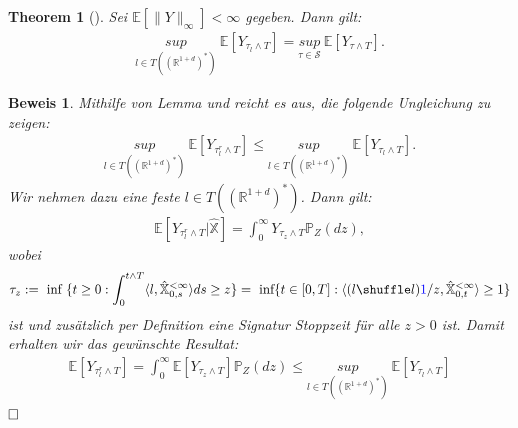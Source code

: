 \documentclass[12pt,titlepage,headsepline]{article}
\newtheorem*{theorem-non}{Theorem}
\newtheorem*{beweis-non}{Beweis}
\begin{document}
      \begin{theorem-non}[\cite{bayer_optimal_2020,Prop. 5.5}]
        Sei $\mathbb{E}[\lVert Y\rVert_\infty]<\infty$ gegeben. Dann gilt:
        \begin{align}\label{stopped_rough_path: main_equality}
          \underset{l \in T((\mathbb{R}^{1+d})^*)}{sup} \ \mathbb{E}[Y_{\tau_l \land T}] = \underset{\tau \in \mathcal{S}}{sup} \ \mathbb{E}[Y_{\tau \land T}].
        \end{align}
      \end{theorem-non}
      \begin{beweis-non}
        \textup{
        Mithilfe von Lemma und reicht es aus, die folgende Ungleichung zu zeigen:
        \begin{align*}
          \underset{l \in T((\mathbb{R}^{1+d})^*)}{sup} \ \mathbb{E}[Y_{\tau_l^r \land T}] \leq \underset{l \in T((\mathbb{R}^{1+d})^*)}{sup} \ \mathbb{E}[Y_{\tau_l \land T}].
        \end{align*}
        Wir nehmen dazu eine feste $l \in T((\mathbb{R}^{1+d})^*)$. Dann gilt:
        \begin{align*}
          \mathbb{E}[Y_{\tau_l^r \land T} \lvert \hat{\mathbb{X}}] = \int_0^{\infty} Y_{\tau_z\land T}\mathbb{P}_Z(dz),
        \end{align*}
        wobei
        \begin{align*}
          \tau_z := \ \text{inf} \ \{t \geq 0 : \int_0^{t \land T} \langle l,\hat{\mathbb{X}}^{<\infty}_{0,s}\rangle ds \geq z \}= \ \text{inf}\{t \in [0,T] : \langle (l \shuffle l)\textcolor{blue}{1}/z,\hat{\mathbb{X}}^{<\infty}_{0,t} \rangle \geq 1 \}
        \end{align*}
        ist und zusätzlich per Definition eine Signatur Stoppzeit für alle $z>0$ ist. Damit erhalten wir das gewünschte Resultat:
        \begin{align*}
          \mathbb{E}[Y_{\tau_l^r \land T}] = \int_0^{\infty} \mathbb{E}[Y_{\tau_z\land T}]\mathbb{P}_Z(dz) \leq \underset{l \in T((\mathbb{R}^{1+d})^*)}{sup} \ \mathbb{E}[Y_{\tau_l \land T}]
        \end{align*}
        }
      $\hfill\Box$
      \end{beweis-non}
\end{document}
